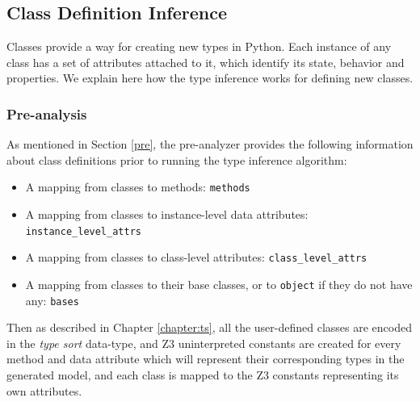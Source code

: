 \subsection{Class Definition Inference}
Classes provide a way for creating new types in Python. Each instance of any class has a set of attributes attached to it, which identify its state, behavior and properties. We explain here how the type inference works for defining new classes. \\

\subsubsection{Pre-analysis}
As mentioned in Section \ref{pre}, the pre-analyzer provides the following information about class definitions prior to running the type inference algorithm:
\begin{itemize}
	\item A mapping from classes to methods: \lstinline|methods|
	\item A mapping from classes to instance-level data attributes: \lstinline|instance_level_attrs|
	\item A mapping from classes to class-level attributes: \lstinline|class_level_attrs|
	\item A mapping from classes to their base classes, or to \lstinline|object| if they do not have any: \lstinline|bases|
\end{itemize}
Then as described in Chapter \ref{chapter:ts}, all the user-defined classes are encoded in the \textit{type sort} data-type, and Z3 uninterpreted constants are created for every method and data attribute which will represent their corresponding types in the generated model, and each class is mapped to the Z3 constants representing its own attributes.

